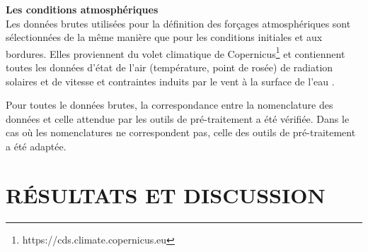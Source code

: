 \documentclass[10pt,a4paper,titlepage]{article}
\begin{document}

\textbf{Les conditions atmosphériques}\\
Les données brutes utilisées pour la définition des forçages atmosphériques sont sélectionnées de la même manière que pour les conditions initiales et aux bordures.
Elles proviennent du volet climatique de Copernicus\footnote{https://cds.climate.copernicus.eu} et contiennent toutes les données d'état de l'air (température, point de rosée) de radiation solaires et de vitesse et contraintes induits par le vent à la surface de l'eau \parencite{copernicus_climate_data}. %


Pour toutes le données brutes, la correspondance entre la nomenclature des données et celle attendue par les outils de pré-traitement a été vérifiée.
Dans le cas où les nomenclatures ne correspondent pas, celle des outils de pré-traitement a été adaptée.



\newpage
\section{RÉSULTATS ET DISCUSSION}
\label{sec:resultats_discussions}
\label{sec:discussion}





\end{document}
